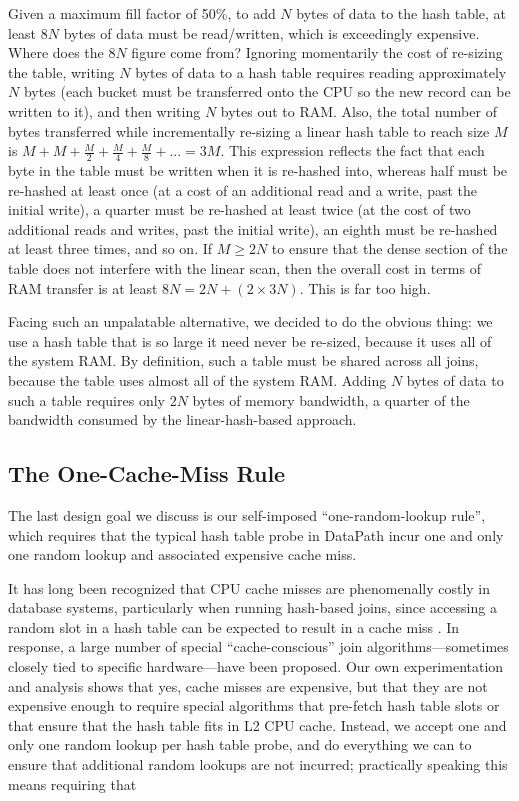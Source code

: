 \documentclass{sig-alternate}
\renewcommand\:{\colon} %
\begin{document}
Given a maximum fill factor of 50\%, to add $N$ bytes of data to the hash table, 
at least $8N$ bytes of data must be read/written, which is exceedingly expensive.
Where does the $8N$ figure come from?  Ignoring momentarily the cost of re-sizing the table, writing $N$ bytes of data to a hash
table requires reading approximately $N$ bytes (each bucket must be transferred onto the CPU so the new record can be written to it), and
then writing $N$ bytes out to RAM.  Also, the total number of bytes 
transferred while incrementally re-sizing a linear hash table to reach size $M$ is 
$M + M + \frac{M}{2} + \frac{M}{4} + \frac{M}{8} + ... = 3M$.
This expression reflects the fact that 
each byte in the table must be written when it is re-hashed into, whereas half must be re-hashed at least
once (at a cost of an additional read and
a write, past the initial write), a quarter must be re-hashed at least twice (at the cost of two additional reads and writes, past
the initial write), an eighth must be re-hashed at least three times, and so on.  If $M \geq 2N$ to ensure that the dense section of the
table does not interfere with the linear scan, then the overall cost in terms of RAM transfer is at least $8N = 2N + (2 \times 3N)$.
This is far too high.

Facing such an unpalatable alternative, we decided to do the obvious thing: we use a hash table that is so large it need never be re-sized,
because it uses all of the system RAM.  By definition, such a table must be shared across all joins, because
the table uses almost all of the
system RAM.  Adding $N$ bytes of data to such a table requires only $2N$ bytes of memory bandwidth, a quarter of the bandwidth
consumed by the linear-hash-based approach.  

\subsection{The One-Cache-Miss Rule}

The last design goal we discuss is our self-imposed ``one-random-lookup rule'', 
which requires that the typical hash table probe in DataPath incur one and only one random lookup and associated expensive cache miss.

It has long been recognized that CPU cache misses are phenomenally costly in database systems, particularly
when running hash-based joins, since accessing a random slot in a hash table can be expected to result in a cache miss \cite{}.
In response, a large number of 
special ``cache-conscious'' join algorithms---sometimes closely tied to specific hardware---have been proposed.
Our own experimentation and analysis shows that yes, cache misses are expensive, but that they are not expensive enough
to require special algorithms that pre-fetch hash table slots or that ensure that the hash table fits in L2 CPU cache.
Instead, we accept one and only one random lookup per hash table probe, and do everything we can to ensure that 
additional random lookups are not incurred; practically speaking this means requiring that 
\end{document}
